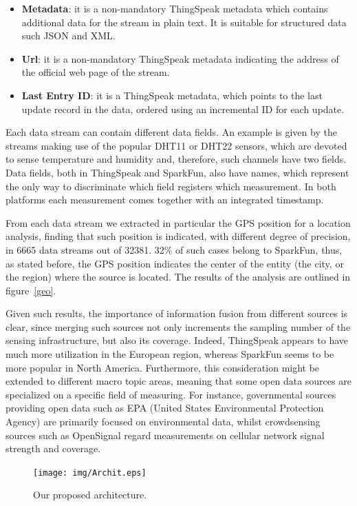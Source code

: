 \begin{itemize}
 \item \textbf{Metadata}: it is a non-mandatory ThingSpeak metadata which contains additional data for the stream in plain text. It is suitable for structured data such JSON and XML.
 \item \textbf{Url}: it is a non-mandatory ThingSpeak metadata indicating the address of the official web page of the stream.
 \item \textbf{Last Entry ID}: it is a ThingSpeak metadata, which points to the last update record in the data, ordered using an incremental ID for each update.
\end{itemize}

Each data stream can contain different data fields.
An example is given by the streams making use of the popular DHT11 or DHT22 sensors, which are devoted to sense temperature and humidity and, therefore, such channels have two fields.
Data fields, both in ThingSpeak and SparkFun, also have names, which represent the only way to discriminate which field registers which measurement.
In both platforms each measurement comes together with an integrated timestamp.

From each data stream we extracted in particular the GPS position for a location analysis, finding that such position is indicated, with different degree of precision, in 6665 data streams out of 32381.
32\% of such cases belong to SparkFun, thus, as stated before, the GPS position indicates the center of the entity (the city, or the region) where the source is located.
The results of the analysis are outlined in figure~\ref{geo}.

Given such results, the importance of information fusion from different sources is clear, since merging such sources not only increments the sampling number of the sensing infrastructure, but also its coverage.
Indeed, ThingSpeak appears to have much more utilization in the European region, whereas SparkFun seems to be more popular in North America.
Furthermore, this consideration might be extended to different macro topic areas, meaning that some open data sources are specialized on a specific field of measuring.
For instance, governmental sources providing open data such as EPA (United States Environmental Protection Agency) \cite{epa} are primarily focused on environmental data, whilst crowdsensing sources such as OpenSignal \cite{opensignal} regard measurements on cellular network signal strength and coverage.

\begin{figure}[!t]
\centering
\texttt{[image: img/Archit.eps]} 
\caption{Our proposed architecture.}
\label{arch}
\end{figure}

